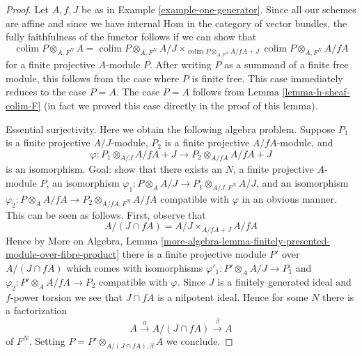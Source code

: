 \documentclass[10pt,a4paper]{amsart}
\theoremstyle{plain}
\theoremstyle{definition}
\theoremstyle{remark}
\numberwithin{equation}{subsection}
\def\colim{\mathop{\mathrm{colim}}\nolimits}
\begin{document}
\begin{proof}
Let $A, f, J$ be as in Example \ref{example-one-generator}.
Since all our schemes are affine and since we have internal
Hom in the category of vector bundles, the fully faithfulness
of the functor follows if we can show that
$$
\colim P \otimes_{A, F^N} A =
\colim P \otimes_{A, F^N} A/J
\times_{\colim P \otimes_{A, F^N} A/fA + J}
\colim P \otimes_{A, F^N} A/fA
$$
for a finite projective $A$-module $P$. After writing $P$ as a summand
of a finite free module, this follows from the case where $P$ is finite
free. This case immediately reduces to the case $P = A$. The case
$P = A$ follows from Lemma \ref{lemma-h-sheaf-colim-F}
(in fact we proved this case directly in the proof of this lemma).

\medskip\noindent
Essential surjectivity. Here we obtain the following algebra problem.
Suppose $P_1$ is a finite projective $A/J$-module,
$P_2$ is a finite projective $A/fA$-module, and
$$
\varphi :
P_1 \otimes_{A/J} A/fA + J
\longrightarrow
P_2 \otimes_{A/fA} A/fA + J
$$
is an isomorphism. Goal: show that there exists an $N$, a finite
projective $A$-module $P$, an isomorphism
$\varphi_1 : P \otimes_A A/J \to P_1 \otimes_{A/J, F^N} A/J$,
and an isomorphism
$\varphi_2 : P \otimes_A A/fA \to P_2 \otimes_{A/fA, F^N} A/fA$
compatible with $\varphi$ in an obvious manner.
This can be seen as follows. First, observe that
$$
A/(J \cap fA) = A/J \times_{A/fA + J} A/fA
$$
Hence by More on Algebra, Lemma
\ref{more-algebra-lemma-finitely-presented-module-over-fibre-product}
there is a finite projective module $P'$ over
$A/(J \cap fA)$ which comes with isomorphisms
$\varphi'_1 : P' \otimes_A A/J \to P_1$ and
$\varphi_2 : P' \otimes_A A/fA \to P_2$
compatible with $\varphi$. Since $J$ is a finitely generated ideal and
$f$-power torsion we see that $J \cap fA$ is a nilpotent
ideal. Hence for some $N$ there is a factorization
$$
A \xrightarrow{\alpha} A/(J \cap fA) \xrightarrow{\beta} A
$$
of $F^N$. Setting $P = P' \otimes_{A/(J \cap fA), \beta} A$
we conclude.
\end{proof}
\end{document}
